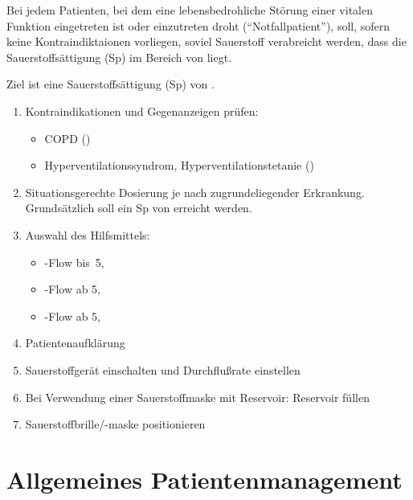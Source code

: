 {\label{m:sauerstoffberieselung}}
{%
Bei jedem Patienten, bei dem eine
lebensbedrohliche Störung einer vitalen Funktion eingetreten
ist oder einzutreten droht (\enquote{Notfallpatient}), soll,
sofern keine Kontraindiktaionen vorliegen, soviel Sauerstoff
verabreicht werden, dass die Sauerstoffsättigung (Sp)
im Bereich von  liegt.

Ziel ist eine Sauerstoffsättigung (Sp) von
.

\begin{enumerate}
  \item Kontraindikationen und Gegenanzeigen prüfen:
  \begin{itemize}
    \item COPD ()
    \item Hyperventilationssyndrom, Hyperventilationstetanie
    ()
  \end{itemize}
  \item Situationsgerechte Dosierung je nach
  zugrundeliegender Erkrankung. Grundsätzlich soll ein
  Sp von
 erreicht werden.
  \item Auswahl des Hilfsmittels:
  \begin{itemize}
    \item {}
    -Flow bis~5\LPerMin*,
    \item {}
    -Flow ab 5\LPerMin*,
    \item {} -Flow ab 5\LPerMin*,
  \end{itemize}
  \item Patientenaufklärung
  \item Sauerstoffgerät einschalten und Durchflußrate
  einstellen
  \item Bei Verwendung einer Sauerstoff\-maske mit
  Reservoir: Reservoir füllen
  \item Sauerstoffbrille/-maske positionieren 
\end{enumerate} 

\cite{AsboeLehrmeinungRd2011-09}
}




\chapter{Allgemeines Patientenmanagement}

